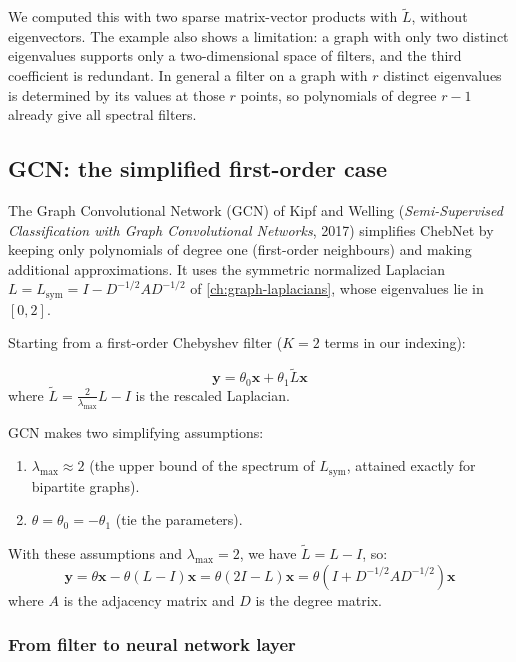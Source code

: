 \begin{notechapter}
\begin{example}
We computed this with two sparse matrix-vector products with $\tilde{L}$, without eigenvectors. The example also shows a limitation: a graph with only two distinct eigenvalues supports only a two-dimensional space of filters, and the third coefficient is redundant. In general a filter on a graph with $r$ distinct eigenvalues is determined by its values at those $r$ points, so polynomials of degree $r-1$ already give all spectral filters.
\end{example}

\subsection{GCN: the simplified first-order case}

The Graph Convolutional Network (GCN) of Kipf and Welling (\emph{Semi-Supervised Classification with Graph Convolutional Networks}, 2017)
simplifies ChebNet by keeping only polynomials of degree one (first-order neighbours) and making additional approximations. It uses the symmetric normalized Laplacian $L = L_{\text{sym}} = I - D^{-1/2}AD^{-1/2}$ of \cref{ch:graph-laplacians}, whose eigenvalues lie in $[0, 2]$.

Starting from a first-order Chebyshev filter ($K=2$ terms in our indexing):

\[
\mathbf{y} = \theta_0 \mathbf{x} + \theta_1 \tilde{L} \mathbf{x}
\]
where $\tilde{L} = \frac{2}{\lambda_{\max}}L - I$ is the rescaled Laplacian.

GCN makes two simplifying assumptions:
\begin{enumerate}
\item $\lambda_{\max} \approx 2$ (the upper bound of the spectrum of $L_{\text{sym}}$, attained exactly for bipartite graphs).
\item $\theta = \theta_0 = -\theta_1$ (tie the parameters).
\end{enumerate}

With these assumptions and $\lambda_{\max} = 2$, we have
$\tilde{L} = L - I$, so:
\[
\mathbf{y} = \theta \mathbf{x} - \theta(L - I)\mathbf{x}
           = \theta(2I - L)\mathbf{x}
           = \theta(I + D^{-1/2} A D^{-1/2})\mathbf{x}
\]
where $A$ is the adjacency matrix and $D$ is the degree matrix.

\subsubsection{From filter to neural network layer}


\end{notechapter}
